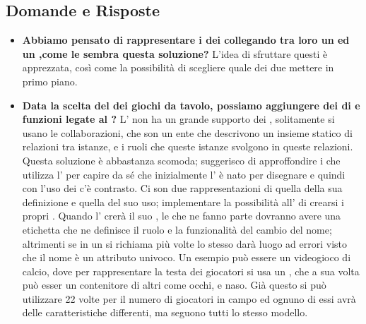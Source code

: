 	  \subsection{Domande e Risposte}
	   \begin{itemize}
	   
	   	   	\item 
	   		\textbf{Abbiamo pensato di rappresentare i  dei  collegando tra loro un  ed un ,come le sembra questa soluzione?}
	    	\justifying     		
L'idea di sfruttare questi  è apprezzata, così come la possibilità di scegliere quale dei due  mettere in primo piano.\\
	   	\item 
	   		\textbf{Data la scelta del  dei giochi da tavolo, possiamo aggiungere dei  di  e funzioni legate al ?}
	    	\justifying     		
L' non ha un grande supporto dei , solitamente si usano le collaborazioni, che son un ente che descrivono un insieme statico di relazioni tra istanze, e i ruoli che queste istanze svolgono in queste relazioni. Questa soluzione è abbastanza scomoda; suggerisco di approffondire i  che utilizza l' per capire da sé che inizialmente l' è nato per disegnare  e quindi con l'uso dei  c'è contrasto. 
Ci son due rappresentazioni di  quella della sua definizione e quella del suo uso; implementare la possibilità all' di crearsi i propri . Quando l' crerà il suo , le  che ne fanno parte dovranno avere una etichetta che ne definisce il ruolo e la funzionalità del cambio del nome; altrimenti se in un  si richiama più volte lo stesso  darà luogo ad errori visto che il nome è un attributo univoco. Un esempio può essere un videogioco di calcio, dove per rappresentare la testa dei giocatori si usa un , che a sua volta può esser un contenitore di altri  come occhi, e naso. Già questo  si può utilizzare 22 volte per il numero di giocatori in campo ed ognuno di essi avrà delle caratteristiche differenti, ma seguono tutti lo stesso modello.

\end{itemize}
